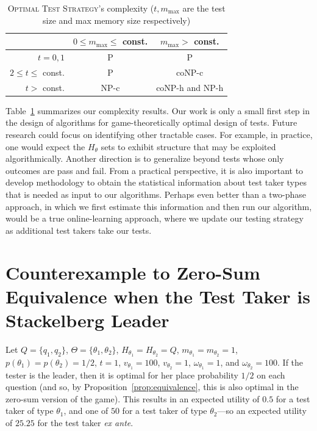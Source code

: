 \documentclass{article}
\begin{document}
\begin{table}
\begin{tabular}{r | c | c }
	& $0 \leq m_\text{max} \leq $ const. & $m_\text{max} > $ const. \\
	\hline
$t=0,1$ & P & P \\
$2 \leq t \leq$ const. & P & coNP-c\\
$t > $ const. & NP-c & coNP-h and NP-h
\end{tabular}
\caption{\textsc{Optimal Test
Strategy}'s complexity ($t, m_{\max}$ are the test size and max memory size respectively)}
\label{tab:results}
\end{table}

Table~\ref{tab:results} summarizes our complexity results.
Our work is only a small first step in the design of algorithms for
game-theoretically optimal design of tests.  Future research could
focus on identifying other tractable cases.  For example, in practice,
one would expect the $H_\theta$ sets to exhibit structure that may be
exploited algorithmically.  
Another direction is to generalize beyond tests whose only outcomes
are pass and fail.
From a practical perspective, it is also
important to develop methodology to obtain the statistical information
about test taker types that is needed as input to our algorithms.
Perhaps even better than a two-phase approach, in which we first
estimate this information and then run our algorithm, would be a true
online-learning approach, where we update our testing strategy as
additional test takers take our tests.



\appendix

\section{Counterexample to Zero-Sum Equivalence when the Test Taker is
  Stackelberg Leader}
\label{se:counterexample}

Let $Q=\{q_1,q_2\}$, $\Theta=\{\theta_1,\theta_2\}$,
$H_{\theta_1}=H_{\theta_2}=Q$, $m_{\theta_1}=m_{\theta_2}=1$,
$p(\theta_1)=p(\theta_2)=1/2$, $t=1$, $v_{\theta_1} = 100$, $v_{\theta_2} =
1$, $\omega_{\theta_1} = 1$, and $\omega_{\theta_2} = 100$.  If the tester
is the leader, then it is optimal for her place probability $1/2$ on each
question (and so, by Proposition~\ref{prop:equivalence}, this is also
optimal in the zero-sum version of the game).  This results in an expected
utility of $0.5$ for a test taker of type $\theta_1$, and one of $50$ for a
test taker of type $\theta_2$---so an expected utility of $25.25$ for the
test taker {\em ex ante}.
\end{document}
